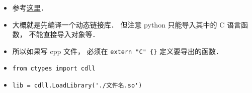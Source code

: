 
\begin{issues}
\issueDraft
\end{issues}

\begin{itemize}
\item 参考\href{https://www.geeksforgeeks.org/how-to-call-c-c-from-python/}{这里}．
\item 大概就是先编译一个动态链接库． 但注意 python 只能导入其中的 C 语言函数， 不能直接导入对象等．
\item 所以如果写 cpp 文件， 必须在 \verb|extern "C" {}| 定义要导出的函数．
\item \verb|from ctypes import cdll|
\item \verb|lib = cdll.LoadLibrary('./文件名.so')|
\end{itemize}
